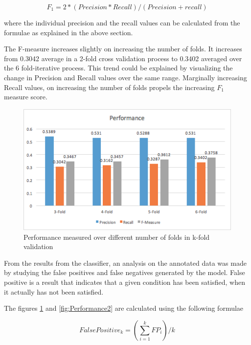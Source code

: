 \documentclass{sig-alternate-05-2015}
\begin{document}
\begin{equation}
F_1 = 2*(Precision*Recall)/(Precision+recall)
\end{equation}

where the individual precision and the recall values can be calculated from the formulae as explained in the above section.

The F-measure increases slightly on increasing the number of folds. It increases from 0.3042 average in a 2-fold cross validation process to 0.3402 averaged over the 6 fold-iterative process. This trend could be explained by visualizing the change in Precision and Recall values over the same range. Marginally increasing Recall values, on increasing the number of folds propels the increasing $F_1$ measure score.

\begin{figure}
\centering
  \includegraphics[width=\linewidth]{Performance1.png}
  \caption{Performance measured over different number of folds in k-fold validation}
  \label{fig:Performance1}
\end{figure}



From the results from the classifier, an analysis on the annotated data was made by studying the false positives and false negatives generated by the model. False positive is a result that indicates that a given condition has been satisfied, when it actually has not been satisfied.

The figures \ref{fig:Performance1} and \ref{fig:Performance2} are calculated using the following formulae

\begin{equation}
False Positive_k = (\sum_{i = 1}^{k} FP_i)/k
\end{equation}
\end{document}
